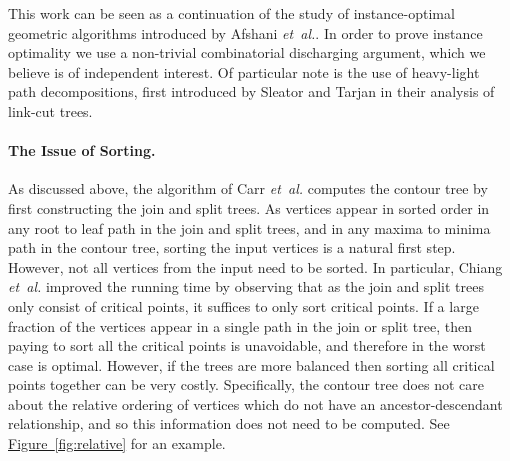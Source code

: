 \documentclass[11pt]{article}
\theoremstyle{definition}
\newcommand{\Fig}[1]{\hyperref[fig:#1]{Figure~\ref*{fig:#1}}} %
\newcommand{\etal}{\textit{et~al.}\xspace}
\begin{document}

This work can be seen as a continuation of the study of instance-optimal geometric algorithms introduced by Afshani \etal \cite{abc-ioga-09}.
In order to prove instance optimality we use a non-trivial combinatorial discharging argument, which we believe is of independent interest.
Of particular note is the use of heavy-light path decompositions, first introduced by Sleator and Tarjan \cite{st-dsdt-83} in their analysis of link-cut trees.



% 


\paragraph{The Issue of Sorting.}
As discussed above, the algorithm of Carr \etal \cite{csa-cctad-00} computes the contour 
tree by first constructing the join and split trees.  As vertices appear in sorted order 
in any root to leaf path in the join and split trees, and in any maxima to minima path 
in the contour tree, sorting the input vertices is a natural first step.  However, not 
all vertices from the input need to be sorted.  In particular, Chiang \etal 
\cite{cllr-sooscctmp-05} improved the running time by observing that as the join and 
split trees only consist of critical points, it suffices to only sort critical points.  
If a large fraction of the vertices appear in a single path in the join or split tree, 
then paying to sort all the critical points is unavoidable, and therefore in the worst 
case \cite{cllr-sooscctmp-05} is optimal.  However, if the trees are more balanced then 
sorting all critical points together can be very costly.  Specifically, the contour tree 
does not care about the relative ordering of vertices which do not have an 
ancestor-descendant relationship, and so this information does not need to be computed.
See \Fig{relative} for an example.
\end{document}
